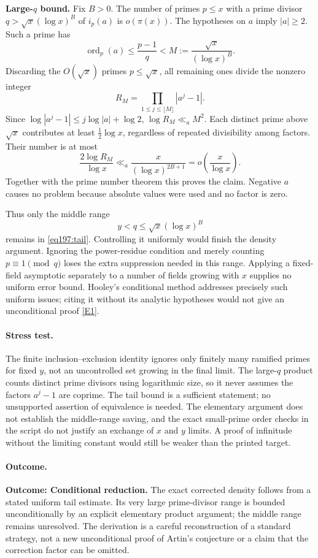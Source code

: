 \documentclass[11pt,a4paper]{article}
\newcommand{\eref}[2]{\hyperlink{extra:#1:#2}{[E#2]}}
\numberwithin{equation}{section}
\begin{document}
\textbf{Large-$q$ bound.} Fix $B>0$. The number of primes $p\le x$ with a prime divisor
$q>\sqrt x(\log x)^B$ of $i_p(a)$ is $o(\pi(x))$.
The hypotheses on $a$ imply $|a|\ge2$. Such a prime has
\[
 \operatorname{ord}_p(a)\le\frac{p-1}{q}<M:=\frac{\sqrt x}{(\log x)^B}.
\]
Discarding the $O(\sqrt x)$ primes $p\le\sqrt x$, all remaining ones divide the nonzero integer
\[
 R_M=\prod_{1\le j\le\lfloor M\rfloor}|a^j-1|.
\]
Since $\log|a^j-1|\le j\log|a|+\log2$,
$\log R_M\ll_a M^2$. Each distinct prime above $\sqrt x$ contributes at least $\tfrac12\log x$, regardless of repeated divisibility among factors. Their number is at most
\[
 \frac{2\log R_M}{\log x}
 \ll_a\frac{x}{(\log x)^{2B+1}}=o\!\left(\frac{x}{\log x}\right).
\]
Together with the prime number theorem this proves the claim. Negative $a$ causes no problem because absolute values were used and no factor is zero.

Thus only the middle range
\[
 y<q\le\sqrt x(\log x)^B
\]
remains in \eqref{eq197:tail}. Controlling it uniformly would finish the density argument. Ignoring the power-residue condition and merely counting $p\equiv1\pmod q$ loses the extra suppression needed in this range. Applying a fixed-field asymptotic separately to a number of fields growing with $x$ supplies no uniform error bound. Hooley's conditional method addresses precisely such uniform issues; citing it without its analytic hypotheses would not give an unconditional proof \eref{statement}{1}.

\paragraph{Stress test.}
The finite inclusion--exclusion identity ignores only finitely many ramified primes for fixed $y$, not an uncontrolled set growing in the final limit. The large-$q$ product counts distinct prime divisors using logarithmic size, so it never assumes the factors $a^j-1$ are coprime. The tail bound is a sufficient statement; no unsupported assertion of equivalence is needed. The elementary argument does not establish the middle-range saving, and the exact small-prime order checks in the script do not justify an exchange of $x$ and $y$ limits. A proof of infinitude without the limiting constant would still be weaker than the printed target.

\paragraph{Outcome.}
\textbf{Outcome: Conditional reduction.}
The exact corrected density follows from a stated uniform tail estimate. Its very large prime-divisor range is bounded unconditionally by an explicit elementary product argument; the middle range remains unresolved. The derivation is a careful reconstruction of a standard strategy, not a new unconditional proof of Artin's conjecture or a claim that the correction factor can be omitted.
\end{document}

